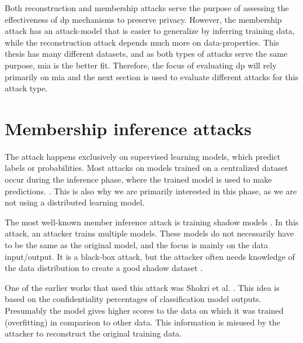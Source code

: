 Both reconstruction and membership attacks serve the purpose of assessing the effectiveness of \gls{dp} mechanisms to preserve privacy. 
However, the membership attack has an attack-model that is easier to generalize by inferring training data, while the reconstruction attack depends much more on data-properties.
This thesis has many different datasets, and as both types of attacks serve the same purpose, \gls{mia} is the better fit. \newline
Therefore, the focus of evaluating \gls{dp} will rely primarily on \gls{mia} and the next section is used to evaluate different attacks for this attack type.


\section{Membership inference attacks}
The attack happens exclusively on supervised learning models, which predict labels or probabilities.
Most attacks on models trained on a centralized dataset occur during the inference phase, where the trained model is used to make predictions. \citep{rigaki_survey_2021}.
This is also why we are primarily interested in this phase, as we are not using a distributed learning model.

The most well-known member inference attack is training shadow models \citep{rigaki_survey_2021}.
In this attack, an attacker trains multiple models.
These models do not necessarily have to be the same as the original model, and the focus is mainly on the data input/output.
It is a black-box attack, but the attacker often needs knowledge of the data distribution to create a good shadow dataset \citep{rigaki_survey_2021}.

One of the earlier works that used this attack was Shokri et al. \citep{shokri_membership_2017}.
This idea is based on the confidentiality percentages of classification model outputs. Presumably the model gives higher scores to the data on which it was trained (overfitting) in comparison to other data. This information is misused by the attacker to reconstruct the original training data.

